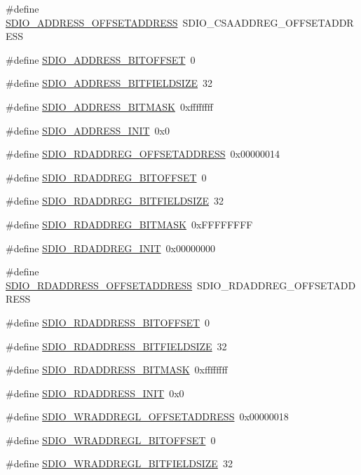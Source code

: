 \begin{DoxyCompactItemize}
\#define \hyperlink{a00571_a00e56301ccff5f6cbb3bff537665cbe1}{SDIO\_\-ADDRESS\_\-OFFSETADDRESS}~SDIO\_\-CSAADDREG\_\-OFFSETADDRESS
\item 
\#define \hyperlink{a00571_af86e27a2ce6863bb7754cbe254e4f475}{SDIO\_\-ADDRESS\_\-BITOFFSET}~0
\item 
\#define \hyperlink{a00571_ae9ff569ad7a9fb3caf54c873654921a2}{SDIO\_\-ADDRESS\_\-BITFIELDSIZE}~32
\item 
\#define \hyperlink{a00571_aaf686ec76989282e9179ea0627c443cc}{SDIO\_\-ADDRESS\_\-BITMASK}~0xffffffff
\item 
\#define \hyperlink{a00571_a96305c0913012e919e11622cb57f11b4}{SDIO\_\-ADDRESS\_\-INIT}~0x0
\item 
\#define \hyperlink{a00571_ad53b6828db9f634839338c5a677b27a8}{SDIO\_\-RDADDREG\_\-OFFSETADDRESS}~0x00000014
\item 
\#define \hyperlink{a00571_a772b8db46f8ba83686cc67d081fa45da}{SDIO\_\-RDADDREG\_\-BITOFFSET}~0
\item 
\#define \hyperlink{a00571_aa910bee36cd15dbdb4dc1dea5d3a54f5}{SDIO\_\-RDADDREG\_\-BITFIELDSIZE}~32
\item 
\#define \hyperlink{a00571_aa1b2939f1373069e83210497dd8d2ff7}{SDIO\_\-RDADDREG\_\-BITMASK}~0xFFFFFFFF
\item 
\#define \hyperlink{a00571_aa95fb0fcecb89ac91630e2173738065f}{SDIO\_\-RDADDREG\_\-INIT}~0x00000000
\item 
\#define \hyperlink{a00571_a530884998f656b08aed3fd0bcf1faff3}{SDIO\_\-RDADDRESS\_\-OFFSETADDRESS}~SDIO\_\-RDADDREG\_\-OFFSETADDRESS
\item 
\#define \hyperlink{a00571_a786d97e9d8dab6b24e0bfb35b8dd9f5d}{SDIO\_\-RDADDRESS\_\-BITOFFSET}~0
\item 
\#define \hyperlink{a00571_a6aaa72c4051c95eb50af167d037da8f9}{SDIO\_\-RDADDRESS\_\-BITFIELDSIZE}~32
\item 
\#define \hyperlink{a00571_a4642d5852a8d62463e484eee908f3749}{SDIO\_\-RDADDRESS\_\-BITMASK}~0xffffffff
\item 
\#define \hyperlink{a00571_a243b48381b4a4ac28a76315abbc18fc2}{SDIO\_\-RDADDRESS\_\-INIT}~0x0
\item 
\#define \hyperlink{a00571_a57f50e791e3dc34111a78aa678494ad0}{SDIO\_\-WRADDREGL\_\-OFFSETADDRESS}~0x00000018
\item 
\#define \hyperlink{a00571_a88b70f04885f6b3f9f8134dac611f150}{SDIO\_\-WRADDREGL\_\-BITOFFSET}~0
\item 
\#define \hyperlink{a00571_aeaa9ea64ccdeafb6a3f811a5be3d1086}{SDIO\_\-WRADDREGL\_\-BITFIELDSIZE}~32

\end{DoxyCompactItemize}
